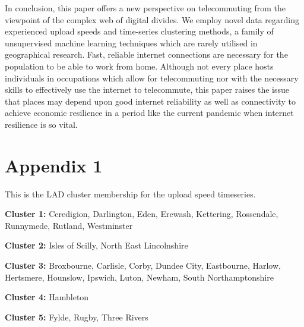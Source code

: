 \documentclass[]{interact}
\theoremstyle{plain}%
\theoremstyle{definition}
\theoremstyle{remark}
\begin{document}
In conclusion, this paper offers a new perspective on telecommuting from
the viewpoint of the complex web of digital divides. We employ novel
data regarding experienced upload speeds and time-series clustering
methods, a family of unsupervised machine learning techniques which are
rarely utilised in geographical research. Fast, reliable internet
connections are necessary for the population to be able to work from
home. Although not every place hosts individuals in occupations which
allow for telecommuting nor with the necessary skills to effectively use
the internet to telecommute, this paper raises the issue that places may
depend upon good internet reliability as well as connectivity to achieve
economic resilience in a period like the current pandemic when internet
resilience is so vital.

\pagebreak

\hypertarget{appendix1}{%
\section*{Appendix 1}\label{appendix1}}

This is the LAD cluster membership for the upload speed timeseries.

\textbf{Cluster 1: } Ceredigion, Darlington, Eden, Erewash, Kettering,
Rossendale, Runnymede, Rutland, Westminster

\textbf{Cluster 2: } Isles of Scilly, North East Lincolnshire

\textbf{Cluster 3: } Broxbourne, Carlisle, Corby, Dundee City,
Eastbourne, Harlow, Hertsmere, Hounslow, Ipswich, Luton, Newham, South
Northamptonshire

\textbf{Cluster 4: } Hambleton

\textbf{Cluster 5: } Fylde, Rugby, Three Rivers
\end{document}
